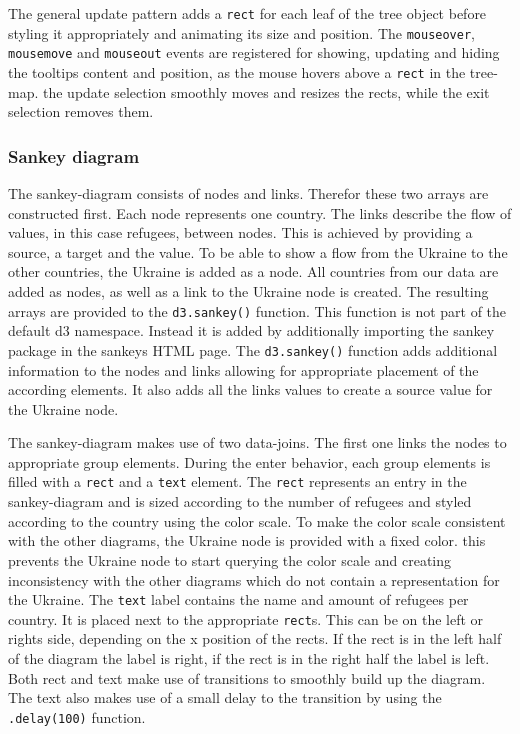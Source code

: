 The general update pattern adds a \texttt{rect} for each leaf of the tree object before styling it appropriately and animating its size and position. The \texttt{mouseover}, \texttt{mousemove} and \texttt{mouseout} events are registered for showing, updating and hiding the tooltips content and position, as the mouse hovers above a \texttt{rect} in the tree-map. the update selection smoothly moves and resizes the rects, while the exit selection removes them.


\subsubsection{Sankey diagram}

The sankey-diagram consists of nodes and links. Therefor these two arrays are constructed first. Each node represents one country. The links describe the flow of values, in this case refugees, between nodes. This is achieved by providing a source, a target and the value. To be able to show a flow from the Ukraine to the other countries, the Ukraine is added as a node. All countries from our data are added as nodes, as well as a link to the Ukraine node is created. The resulting arrays are provided to the \texttt{d3.sankey()} function. This function is not part of the default d3 namespace. Instead it is added by additionally importing the sankey package in the sankeys HTML page. The \texttt{d3.sankey()} function adds additional information to the nodes and links allowing for appropriate placement of the according elements. It also adds all the links values to create a source value for the Ukraine node.

The sankey-diagram makes use of two data-joins. The first one links the nodes to appropriate group elements. During the enter behavior, each group elements is filled with a \texttt{rect} and a \texttt{text} element. The \texttt{rect} represents an entry in the sankey-diagram and is sized according to the number of refugees and styled according to the country using the color scale. To make the color scale consistent with the other diagrams, the Ukraine node is provided with a fixed color. this prevents the Ukraine node to start querying the color scale and creating inconsistency with the other diagrams which do not contain a representation for the Ukraine. The \texttt{text} label contains the name and amount of refugees per country. It is placed next to the appropriate \texttt{rect}s. This can be on the left or rights side, depending on the x position of the rects. If the rect is in the left half of the diagram the label is right, if the rect is in the right half the label is left. Both rect and text make use of transitions to smoothly build up the diagram. The text also makes use of a small delay to the transition by using the \texttt{.delay(100)} function.

